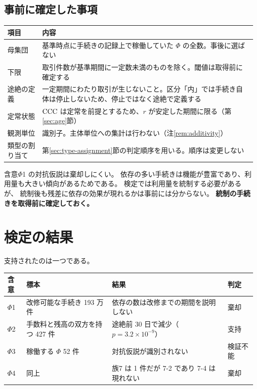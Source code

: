 \subsection{事前に確定した事項}

\begin{center}
\begin{tabularx}{\textwidth}{@{}lX@{}}
\toprule
項目 & 内容 \\
\midrule
母集団 & 基準時点に手続きの記録上で稼働していた $\Phi$ の全数。事後に選ばない \\
下限 & 取引件数が基準期間に一定数未満のものを除く。閾値は取得前に確定する \\
途絶の定義 & 一定期間にわたり取引が生じないこと。区分「内」では手続き自体は停止しないため、停止ではなく途絶で定義する \\
定常状態 & $\mathrm{CCC}$ は定常を前提とするため、$r$ が安定した期間に限る（第\ref{sec:age}節） \\
観測単位 & 識別子。主体単位への集計は行わない（注\ref{rem:additivity}） \\
類型の割り当て & 第\ref{sec:type-assignment}節の判定順序を用いる。順序は変更しない \\
\bottomrule
\end{tabularx}
\label{tab:protocol-registration}
\end{center}

\begin{remark}
\label{rem:dep-usage-confound}
含意$\Phi$1 の対抗仮説は棄却しにくい。
依存の多い手続きは機能が豊富であり、利用量も大きい傾向があるためである。
検定では利用量を統制する必要があるが、
統制後も残差に依存の効果が現れるかは事前には分からない。
\textbf{統制の手続きを取得前に確定しておく。}
\end{remark}

\section{検定の結果}
\label{sec:protocol-results}

支持されたのは一つである。

\begin{center}
\begin{tabularx}{\textwidth}{@{}llXl@{}}
\toprule
含意 & 標本 & 結果 & 判定 \\
\midrule
$\Phi$1 & 改修可能な手続き 193 万件 & 依存の数は改修までの期間を説明しない & 棄却 \\
$\Phi$2 & 手数料と残高の双方を持つ 427 件 & 途絶前 30 日で減少（$p=3.2\times10^{-9}$） & 支持 \\
$\Phi$3 & 稼働する $\Phi$ 52 件 & 対抗仮説が識別されない & 検証不能 \\
$\Phi$4 & 同上 & 族7 は 1 件だが 7-2 であり 7-4 は現れない & 棄却 \\
\bottomrule
\end{tabularx}
\label{tab:protocol-results}
\end{center}

